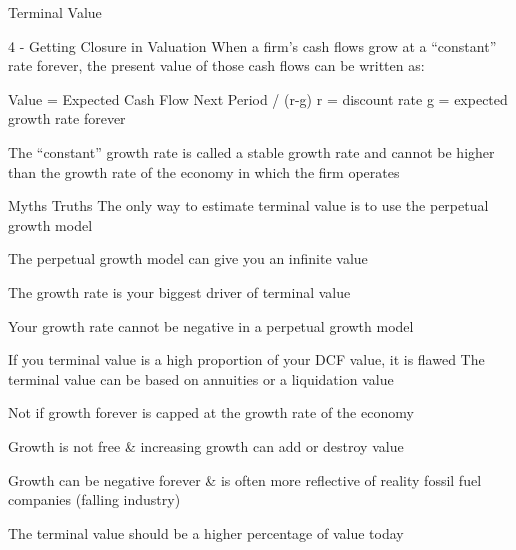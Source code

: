 \documentclass[10pt]{article}
\begin{document}
    \begin{core}{Terminal Value}

      4 - Getting Closure in Valuation
      When a firm’s cash flows grow at a “constant” rate forever, the present value of those cash flows can be written as:

      Value = Expected Cash Flow Next Period / (r-g)
      r = discount rate
      g = expected growth rate forever

      The “constant” growth rate is called a stable growth rate and cannot be higher than the growth rate of the economy in which the firm operates


      Myths
      Truths
      The only way to estimate terminal value is to use the perpetual growth model

      The perpetual growth model can give you an infinite value

      The growth rate is your biggest driver of terminal value

      Your growth rate cannot be negative in a perpetual growth model


      If you terminal value is a high proportion of your DCF value, it is flawed
      The terminal value can be based on annuities or a liquidation value

      Not if growth forever is capped at the growth rate of the economy

      Growth is not free & increasing growth can add or destroy value

      Growth can be negative forever & is often more reflective of reality
      fossil fuel companies (falling industry)

      The terminal value should be a higher percentage of value today

    \end{core}
\end{document}
